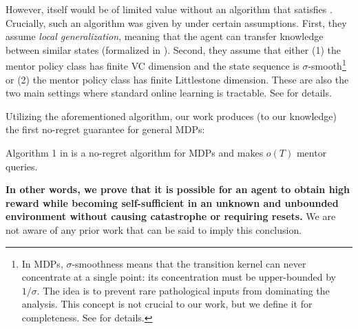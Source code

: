 However,  itself would be of limited value without an algorithm that satisfies . Crucially, such an algorithm was given by \citet{plaut_avoiding_2024} under certain assumptions. First, they assume \emph{local generalization}, meaning that the agent can transfer knowledge between similar states (formalized in ). Second, they assume that either (1) the mentor policy class has finite VC dimension and the state sequence is $\sigma$-smooth\footnote{In MDPs, $\sigma$-smoothness means that the transition kernel can never concentrate at a single point: its concentration must be upper-bounded by $1/\sigma$. The idea is to prevent rare pathological inputs from dominating the analysis. This concept is not crucial to our work, but we define it for completeness. See  for details.} or (2) the mentor policy class has finite Littlestone dimension. These are also the two main settings where standard online learning is tractable. See  for details.


Utilizing the aforementioned algorithm, our work produces (to our knowledge) the first no-regret guarantee for general MDPs:


\begin{theoremNumbered} 
Algorithm 1 in \citet{plaut_avoiding_2024} is a no-regret algorithm for MDPs and makes $o(T)$ mentor queries.
\end{theoremNumbered}


\textbf{In other words, we prove that it is possible for an agent to obtain high reward while becoming self-sufficient in an unknown and unbounded environment without causing catastrophe or requiring resets.} We are not aware of any prior work that can be said to imply this conclusion.